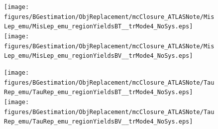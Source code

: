 \begin{figure}[htbp]
  \begin{center}
    \texttt{[image: figures/BGestimation/ObjReplacement/mcClosure\_ATLASNote/MisLep\_emu/MisLep\_emu\_regionYieldsBT\_\_trMode4\_NoSys.eps]}
    \label{fig::BGestimation::objRep::mcClosure::MisLep_regionYieldsBT}
    \texttt{[image: figures/BGestimation/ObjReplacement/mcClosure\_ATLASNote/MisLep\_emu/MisLep\_emu\_regionYieldsBV\_\_trMode4\_NoSys.eps]}
    \label{fig::BGestimation::objRep::mcClosure::MisLep_regionYieldsBV}
  \end{center}
\end{figure}

\begin{figure}[htbp]
  \begin{center}
    \texttt{[image: figures/BGestimation/ObjReplacement/mcClosure\_ATLASNote/TauRep\_emu/TauRep\_emu\_regionYieldsBT\_\_trMode4\_NoSys.eps]}
    \label{fig::BGestimation::objRep::mcClosure::TauRep_regionYieldsBT}
    \texttt{[image: figures/BGestimation/ObjReplacement/mcClosure\_ATLASNote/TauRep\_emu/TauRep\_emu\_regionYieldsBV\_\_trMode4\_NoSys.eps]}
    \label{fig::BGestimation::objRep::mcClosure::TauRep_regionYieldsBV}
  \end{center}
\end{figure}
\fi

